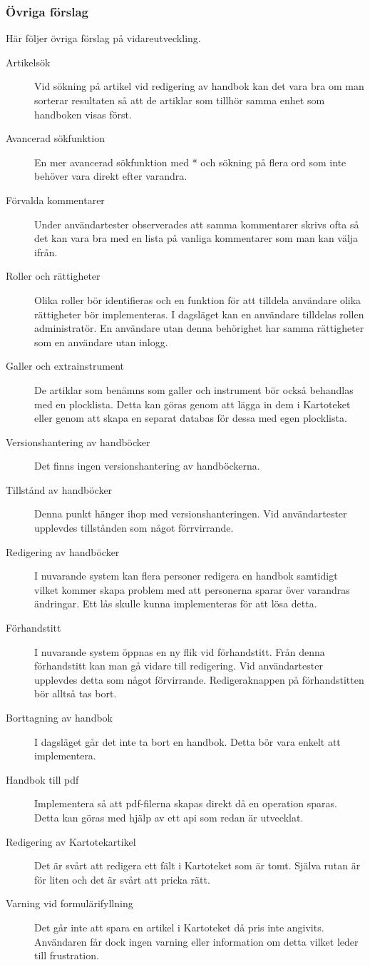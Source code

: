 \documentclass{article}
\begin{document}
\subsubsection{Övriga förslag}
Här följer övriga förslag på vidareutveckling.

\begin{description}
\item[Artikelsök] Vid sökning på artikel vid redigering av handbok kan det vara bra om man sorterar resultaten så att de artiklar som tillhör samma enhet som handboken visas först.
\item[Avancerad sökfunktion] En mer avancerad sökfunktion med * och sökning på flera ord som inte behöver vara direkt efter varandra.
\item[Förvalda kommentarer] Under användartester observerades att samma kommentarer skrivs ofta så det kan vara bra med en lista på vanliga kommentarer som man kan välja ifrån.
\item[Roller och rättigheter] Olika roller bör identifieras och en funktion för att tilldela användare olika rättigheter bör implementeras. I dagsläget kan en användare tilldelas rollen administratör. En användare utan denna behörighet har samma rättigheter som en användare utan inlogg.
\item[Galler och extrainstrument] De artiklar som benämns som galler och instrument bör också behandlas med en plocklista. Detta kan göras genom att lägga in dem i Kartoteket eller genom att skapa en separat databas för dessa med egen plocklista.
\item[Versionshantering av handböcker] Det finns ingen versionshantering av handböckerna. %
\item[Tillstånd av handböcker] Denna punkt hänger ihop med versionshanteringen. Vid användartester upplevdes tillstånden som något förrvirrande.
\item[Redigering av handböcker] I nuvarande system kan flera personer redigera en handbok samtidigt vilket kommer skapa problem med att personerna sparar över varandras ändringar. Ett lås skulle kunna implementeras för att lösa detta.
\item[Förhandstitt] I nuvarande system öppnas en ny flik vid förhandstitt. Från denna förhandstitt kan man gå vidare till redigering. Vid användartester upplevdes detta som något förvirrande. Redigeraknappen på förhandstitten bör alltså tas bort.
\item[Borttagning av handbok] I dagsläget går det inte ta bort en handbok. Detta bör vara enkelt att implementera.
\item[Handbok till pdf] Implementera så att pdf-filerna skapas direkt då en operation sparas. Detta kan göras med hjälp av ett api som redan är utvecklat. %
\item[Redigering av Kartotekartikel] Det är svårt att redigera ett fält i Kartoteket som är tomt. Själva rutan är för liten och det är svårt att pricka rätt.
\item[Varning vid formulärifyllning] Det går inte att spara en artikel i Kartoteket då pris inte angivits. Användaren får dock ingen varning eller information om detta vilket leder till frustration.


\end{description}
\end{document}
